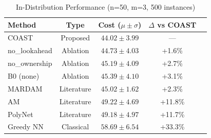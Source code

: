 \begin{table}[t]
\centering\caption{In-Distribution Performance (n=50, m=3, 500 instances)}\label{tab:main}
\begin{tabular}{lcccc}\toprule
Method & Type & Cost ($\mu\pm\sigma$) & $\Delta$ vs COAST \\ \midrule
COAST & Proposed & $44.02\pm3.99$ & --- \\
no\_lookahead & Ablation & $44.73\pm4.03$ & +1.6\% \\
no\_ownership & Ablation & $45.19\pm4.09$ & +2.7\% \\
B0 (none) & Ablation & $45.39\pm4.10$ & +3.1\% \\
MARDAM & Literature & $45.02\pm1.62$ & +2.3\% \\
AM & Literature & $49.22\pm4.69$ & +11.8\% \\
PolyNet & Literature & $49.18\pm4.97$ & +11.7\% \\
Greedy NN & Classical & $58.69\pm6.54$ & +33.3\% \\ \bottomrule
\end{tabular}\end{table}